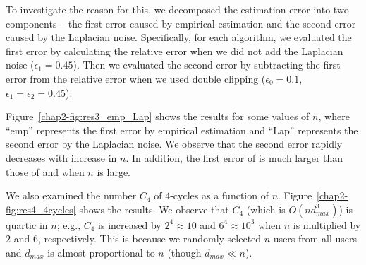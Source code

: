 To investigate the reason for this, we decomposed the estimation error into two components -- 
the first error caused by empirical estimation and the second error caused by the Laplacian noise. 
Specifically, for each algorithm, 
we evaluated the first error by calculating the relative error when we did not add the Laplacian noise ($\epsilon_1 = 0.45$). 
Then we evaluated the second error by subtracting the first error from the relative error when we used double clipping ($\epsilon_0=0.1$, $\epsilon_1 = \epsilon_2 = 0.45$). 

Figure~\ref{chap2-fig:res3_emp_Lap} shows the results for some values of $n$, where ``emp'' represents the first error by empirical estimation and ``Lap'' represents the second error by the Laplacian noise. 
We observe that the second error 
rapidly decreases with increase in $n$. 
In addition, 
the first error of \AlgOne{} is much larger than those of \AlgTwo{} and \AlgThree{} when $n$ is large. 

We also examined 
the number $C_4$ of $4$-cycles as a function of $n$. Figure~\ref{chap2-fig:res4_4cycles} shows the results. 
We observe that $C_4$ (which is $O(n d_{max}^3)$) is quartic in $n$; e.g., $C_4$ is increased by $2^4 \approx 10$ and $6^4 \approx 10^3$ when $n$ is multiplied by $2$ and $6$, respectively. 
This is because we randomly selected $n$ users from all users and $d_{max}$ is almost proportional to $n$ (though $d_{max} \ll n$). 

